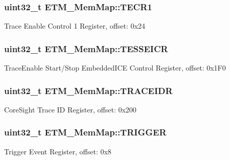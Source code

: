\subsubsection[{T\+E\+C\+R1}]{\setlength{\rightskip}{0pt plus 5cm}uint32\+\_\+t E\+T\+M\+\_\+\+Mem\+Map\+::\+T\+E\+C\+R1}\label{struct_e_t_m___mem_map_a190e1e7ffbcf9b1b6c6d543aa4e1fbc4}
Trace Enable Control 1 Register, offset\+: 0x24 \hypertarget{struct_e_t_m___mem_map_a81f0d20c0c8efb46c6c06bcc30c5947e}{}
\subsubsection[{T\+E\+S\+S\+E\+I\+C\+R}]{\setlength{\rightskip}{0pt plus 5cm}uint32\+\_\+t E\+T\+M\+\_\+\+Mem\+Map\+::\+T\+E\+S\+S\+E\+I\+C\+R}\label{struct_e_t_m___mem_map_a81f0d20c0c8efb46c6c06bcc30c5947e}
Trace\+Enable Start/\+Stop Embedded\+I\+C\+E Control Register, offset\+: 0x1\+F0 \hypertarget{struct_e_t_m___mem_map_a9f0f88f9e4c2bbb77d22f216cce40e7a}{}
\subsubsection[{T\+R\+A\+C\+E\+I\+D\+R}]{\setlength{\rightskip}{0pt plus 5cm}uint32\+\_\+t E\+T\+M\+\_\+\+Mem\+Map\+::\+T\+R\+A\+C\+E\+I\+D\+R}\label{struct_e_t_m___mem_map_a9f0f88f9e4c2bbb77d22f216cce40e7a}
Core\+Sight Trace I\+D Register, offset\+: 0x200 \hypertarget{struct_e_t_m___mem_map_a0acebf95863ac9ae5ccbc9a87e48be62}{}
\subsubsection[{T\+R\+I\+G\+G\+E\+R}]{\setlength{\rightskip}{0pt plus 5cm}uint32\+\_\+t E\+T\+M\+\_\+\+Mem\+Map\+::\+T\+R\+I\+G\+G\+E\+R}\label{struct_e_t_m___mem_map_a0acebf95863ac9ae5ccbc9a87e48be62}
Trigger Event Register, offset\+: 0x8 \hypertarget{struct_e_t_m___mem_map_ad30bdaff018bc7d3b586ce0ca41dfd9b}{}
